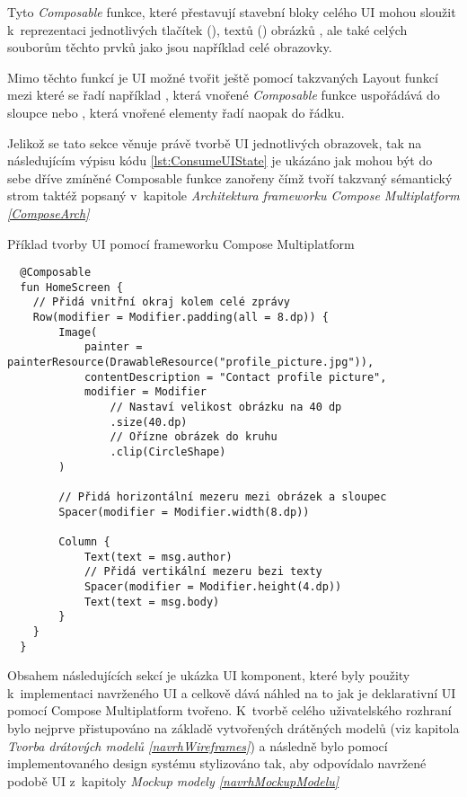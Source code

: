 Tyto \textit{Composable} funkce, které přestavují stavební bloky celého UI mohou sloužit k~reprezentaci jednotlivých tlačítek (), 
textů () obrázků , ale také celých souborům těchto prvků jako jsou například celé obrazovky.

Mimo těchto funkcí je UI možné tvořit ještě pomocí takzvaných Layout funkcí mezi které se řadí například , která vnořené \textit{Composable}
funkce uspořádává do sloupce nebo , která vnořené elementy řadí naopak do řádku.

Jelikož se tato sekce věnuje právě tvorbě UI jednotlivých obrazovek, tak na následujícím výpisu kódu \ref{lst:ConsumeUIState} je ukázáno jak mohou
 být do sebe dříve zmíněné Composable funkce zanořeny čímž tvoří takzvaný sémantický strom taktéž popsaný v~kapitole 
 \textit{Architektura frameworku Compose Multiplatform \ref{ComposeArch}}

\begin{listing}[H]
\caption{Příklad tvorby UI pomocí frameworku Compose Multiplatform}\label{lst:ConsumeUIState}
\begin{verbatim}
  @Composable
  fun HomeScreen {
    // Přidá vnitřní okraj kolem celé zprávy
    Row(modifier = Modifier.padding(all = 8.dp)) {
        Image(
            painter = painterResource(DrawableResource("profile_picture.jpg")),
            contentDescription = "Contact profile picture",
            modifier = Modifier
                // Nastaví velikost obrázku na 40 dp
                .size(40.dp)
                // Ořízne obrázek do kruhu
                .clip(CircleShape)
        )

        // Přidá horizontální mezeru mezi obrázek a sloupec
        Spacer(modifier = Modifier.width(8.dp))

        Column {
            Text(text = msg.author)
            // Přidá vertikální mezeru bezi texty
            Spacer(modifier = Modifier.height(4.dp))
            Text(text = msg.body)
        }
    }
  }
\end{verbatim}
\end{listing}



Obsahem následujících sekcí je ukázka UI komponent, které byly použity k~implementaci navrženého UI a celkově dává náhled na to
jak je deklarativní UI pomocí Compose Multiplatform tvořeno. K~tvorbě celého uživatelského rozhraní bylo nejprve přistupováno na základě vytvořených 
drátěných modelů (viz kapitola \textit{Tvorba drátových modelů \ref{navrhWireframes}}) a následně bylo pomocí implementovaného design systému
stylizováno tak, aby odpovídalo navržené podobě UI z~kapitoly \textit{Mockup modely \ref{navrhMockupModelu}}

